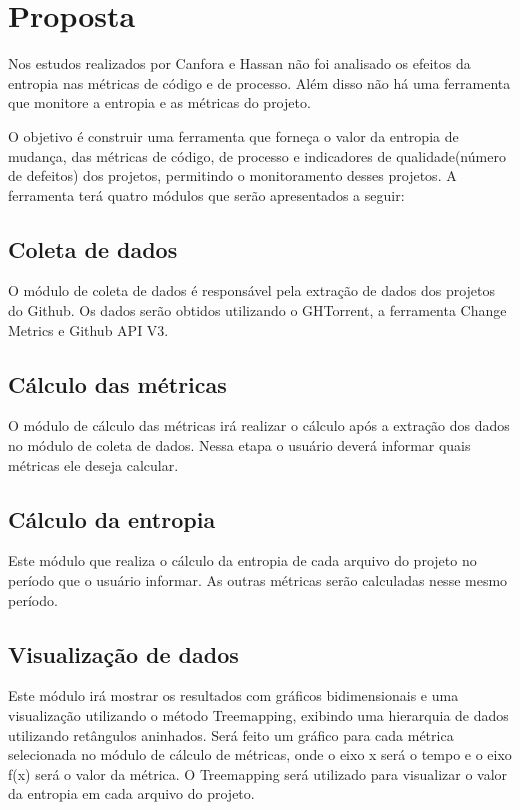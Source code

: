 \chapter{Proposta}
Nos estudos realizados por Canfora e Hassan não foi analisado os efeitos da entropia nas métricas de código e de processo. Além disso não há uma ferramenta que monitore a entropia e as métricas do projeto.

O objetivo é construir uma ferramenta que forneça o valor da entropia de mudança, das métricas de código, de processo e indicadores de qualidade(número de defeitos) dos projetos, permitindo o monitoramento desses projetos. A ferramenta terá quatro módulos que serão apresentados a seguir:

\section{Coleta de dados}
O módulo de coleta de dados é responsável pela extração de dados dos projetos do Github. Os dados serão obtidos utilizando o GHTorrent, a ferramenta Change Metrics e Github API V3. 

\section{Cálculo das métricas}
O módulo de cálculo das métricas irá realizar o cálculo após a extração dos dados no módulo de coleta de dados. Nessa etapa o usuário deverá informar quais métricas ele deseja calcular.

\section{Cálculo da entropia}
Este módulo que realiza o cálculo da entropia de cada arquivo do projeto no período que o usuário informar. As outras métricas serão calculadas nesse mesmo período. 

\section{Visualização de dados}
Este módulo irá mostrar os resultados com gráficos bidimensionais e uma visualização utilizando o método Treemapping, exibindo uma hierarquia de dados utilizando retângulos aninhados. Será feito um gráfico para cada métrica selecionada no módulo de cálculo de métricas, onde o eixo x será o tempo e o eixo f(x) será o valor da métrica. O Treemapping será utilizado para visualizar o valor da entropia em cada arquivo do projeto.